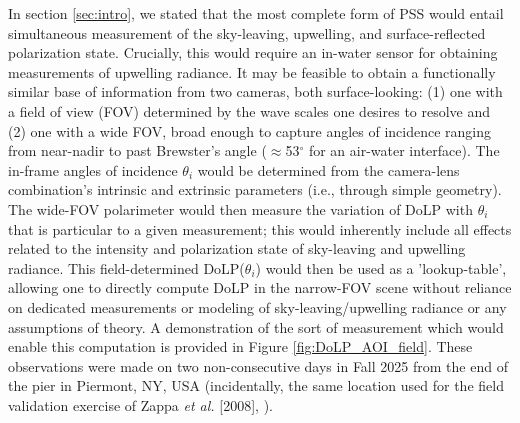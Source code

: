 \documentclass[letterpaper,journal]{IEEEtran}
\begin{document}
In section \ref{sec:intro}, we stated that the most complete form of PSS would entail simultaneous measurement of the sky-leaving, upwelling, and surface-reflected polarization state. Crucially, this would require an in-water sensor for obtaining measurements of upwelling radiance. It may be feasible to obtain a functionally similar base of information from two cameras, both surface-looking: (1) one with a field of view (FOV) determined by the wave scales one desires to resolve and (2) one with a wide FOV, broad enough to capture angles of incidence ranging from near-nadir to past Brewster's angle ($\approx$53$^{\circ}$ for an air-water interface). The in-frame angles of incidence $\theta_i$ would be determined from the camera-lens combination's intrinsic and extrinsic parameters (i.e., through simple geometry). The wide-FOV polarimeter would then measure the variation of DoLP with $\theta_i$ that is particular to a given measurement; this would inherently include all effects related to the intensity and polarization state of sky-leaving and upwelling radiance. This field-determined DoLP($\theta_i$) would then be used as a 'lookup-table', allowing one to directly compute DoLP in the narrow-FOV scene without reliance on dedicated measurements or modeling of sky-leaving/upwelling radiance \cite{foster_characterization_2015,foster_polarized_2016} or any assumptions of theory. A demonstration of the sort of measurement which would enable this computation is provided in Figure \ref{fig:DoLP_AOI_field}. These observations were made on two non-consecutive days in Fall 2025 from the end of the pier in Piermont, NY, USA (incidentally, the same location used for the field validation exercise of Zappa \emph{et al.} [2008], \cite{Zappa2008}).
\end{document}

